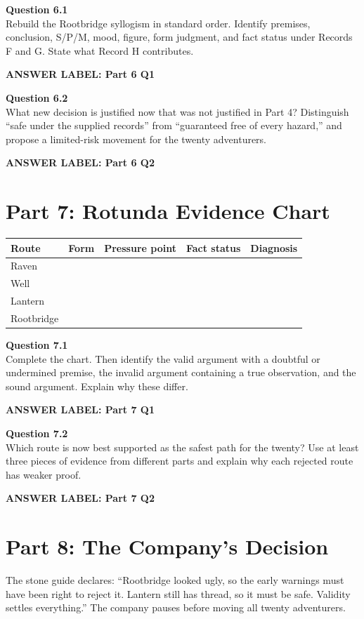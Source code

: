 \documentclass[12pt]{article}
\newcommand{\answerbox}[2]{\par\vspace{0.1em}\noindent\textbf{#1}\par\vspace{0.03em}\noindent\fbox{\begin{minipage}[t][#2]{\dimexpr\textwidth-2\fboxsep-2\fboxrule}\rule{\textwidth}{0pt}\vspace{#2}\end{minipage}}\par\vspace{0.18em}}
\begin{document}
\textbf{Question 6.1}\\[-0.15em]
Rebuild the Rootbridge syllogism in standard order. Identify premises, conclusion, S/P/M, mood, figure, form judgment, and fact status under Records F and G. State what Record H contributes.
\answerbox{ANSWER LABEL: Part 6 Q1}{1.85in}

\textbf{Question 6.2}\\[-0.15em]
What new decision is justified now that was not justified in Part 4? Distinguish ``safe under the supplied records'' from ``guaranteed free of every hazard,'' and propose a limited-risk movement for the twenty adventurers.
\answerbox{ANSWER LABEL: Part 6 Q2}{1.25in}

\newpage
\section*{Part 7: Rotunda Evidence Chart}
\renewcommand{\arraystretch}{1.25}
\begin{tabular}{|p{}|p{}|p{}|p{}|p{}|}
\hline
\textbf{Route} & \textbf{Form} & \textbf{Pressure point} & \textbf{Fact status} & \textbf{Diagnosis}\\ \hline
Raven & & & & \\[0.38in] \hline
Well & & & & \\[0.38in] \hline
Lantern & & & & \\[0.38in] \hline
Rootbridge & & & & \\[0.38in] \hline
\end{tabular}

\textbf{Question 7.1}\\[-0.15em]
Complete the chart. Then identify the valid argument with a doubtful or undermined premise, the invalid argument containing a true observation, and the sound argument. Explain why these differ.
\answerbox{ANSWER LABEL: Part 7 Q1}{1.45in}

\textbf{Question 7.2}\\[-0.15em]
Which route is now best supported as the safest path for the twenty? Use at least three pieces of evidence from different parts and explain why each rejected route has weaker proof.
\answerbox{ANSWER LABEL: Part 7 Q2}{1.55in}

\newpage
\section*{Part 8: The Company's Decision}
The stone guide declares: ``Rootbridge looked ugly, so the early warnings must have been right to reject it. Lantern still has thread, so it must be safe. Validity settles everything.'' The company pauses before moving all twenty adventurers.
\end{document}
